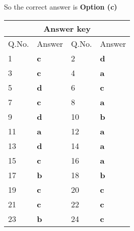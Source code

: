 \begin{enumerate}
\begin{answer}
		So the correct answer is \textbf{Option (c)}
	\end{answer}
	\setlength\arrayrulewidth{1pt}
	\begin{table}[H]
		\centering
		\begin{tabular}{|p{1.5cm}|p{1.5cm}||p{1.5cm}|p{1.5cm}|}
			\hline
			\multicolumn{4}{|c|}{\textbf{Answer key}}\\\hline\hline
			\rowcolor{ocrel}Q.No.&Answer&Q.No.&Answer\\\hline
			1&\textbf{c} &2&\textbf{d}\\\hline 
			3&\textbf{c} &4&\textbf{a} \\\hline
			5&\textbf{d} &6&\textbf{c} \\\hline
			7&\textbf{c}&8&\textbf{a}\\\hline
			9&\textbf{d}&10&\textbf{b}\\\hline
			11&\textbf{a} &12&\textbf{a}\\\hline
			13&\textbf{d}&14&\textbf{a}\\\hline
			15&\textbf{c}&16&\textbf{a}\\\hline
			17&\textbf{b}&18&\textbf{b}\\\hline
			19&\textbf{c}&20&\textbf{c}\\\hline
			21&\textbf{c} &22&\textbf{c}\\\hline
			23&\textbf{b}&24&\textbf{c}\\\hline
		\end{tabular}
	\end{table}
	
	
	
	
	
	
	
	
	
	
	
	
	
	
	
	
	
\end{enumerate}
























